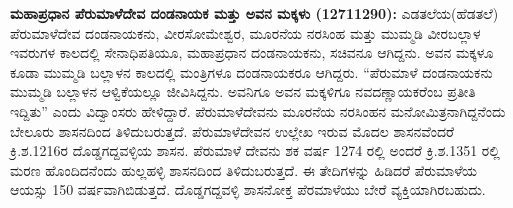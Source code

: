 \textbf{ಮಹಾಪ್ರಧಾನ ಪೆರುಮಾಳೆದೇವ ದಂಡನಾಯಕ ಮತ್ತು ಅವನ ಮಕ್ಕಳು (1271\general{\enginline{-}}1290):} ಎಡತಲೆಯ(ಹೆಡತಲೆ) ಪೆರುಮಾಳೆದೇವ ದಂಡನಾಯಕನು, ವೀರಸೋಮೇಶ್ವರ, ಮೂರನೆಯ ನರಸಿಂಹ ಮತ್ತು ಮುಮ್ಮಡಿ ವೀರಬಲ್ಲಾಳ ಇವರುಗಳ ಕಾಲದಲ್ಲಿ ಸೇನಾಧಿಪತಿಯೂ, ಮಹಾಪ್ರಧಾನ ದಂಡನಾಯಕನು, ಸಚಿವನೂ ಆಗಿದ್ದನು. ಅವನ ಮಕ್ಕಳೂ ಕೂಡಾ ಮುಮ್ಮಡಿ ಬಲ್ಲಾಳನ ಕಾಲದಲ್ಲಿ ಮಂತ್ರಿಗಳೂ ದಂಡನಾಯಕರೂ ಆಗಿದ್ದರು. “ಪೆರುಮಾಳೆ ದಂಡನಾಯಕನು ಮುಮ್ಮಡಿ ಬಲ್ಲಾಳನ ಆಳ್ವಿಕೆಯಲ್ಲೂ ಜೀವಿಸಿದ್ದನು. ಅವನಿಗೂ ಅವನ ಮಕ್ಕಳಿಗೂ ನವದಣ್ಣಾಯಕರೆಂಬ ಪ್ರತೀತಿ ಇದ್ದಿತು” ಎಂದು ವಿದ್ವಾಂಸರು ಹೇಳಿದ್ದಾರೆ. ಪೆರುಮಾಳೆದೇವನು ಮೂರನೆಯ ನರಸಿಂಹನ ಮನೋಮಿತ್ರನಾಗಿದ್ದನೆಂದು ಬೇಲೂರು ಶಾಸನದಿಂದ ತಿಳಿದುಬರುತ್ತದೆ. ಪೆರುಮಾಳೆದೇವನ ಉಲ್ಲೇಖ ಇರುವ ಮೊದಲ ಶಾಸನವೆಂದರೆ ಕ್ರಿ.ಶ.1216ರ ದೊಡ್ಡಗದ್ದವಳ್ಳಿಯ ಶಾಸನ. ಪೆರುಮಾಳೆ ದೇವನು ಶಕ ವರ್ಷ 1274 ರಲ್ಲಿ ಅಂದರೆ ಕ್ರಿ.ಶ.1351 ರಲ್ಲಿ ಮರಣ ಹೊಂದಿದನೆಂದು ಹುಲ್ಲಹಳ್ಳಿ ಶಾಸನದಿಂದ ತಿಳಿದುಬರುತ್ತದೆ. ಈ ತೇದಿಗಳನ್ನು ಹಿಡಿದರೆ ಪೆರುಮಾಳೆಯ ಆಯಸ್ಸು 150 ವರ್ಷವಾಗಿಬಿಡುತ್ತದೆ. ದೊಡ್ಡಗದ್ದವಳ್ಳಿ ಶಾಸನೋಕ್ತ ಪೆರಮಾಳೆಯು ಬೇರೆ ವ್ಯಕ್ತಿಯಾಗಿರಬಹುದು.

